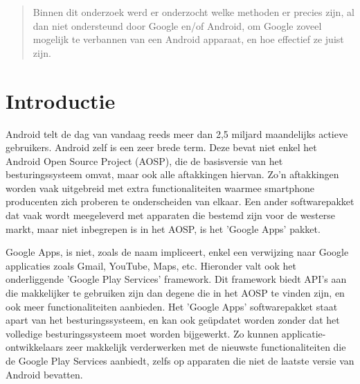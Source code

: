 \documentclass[a0,portrait]{a0poster}
\begin{document}
\begin{multicols}{2} %


\color{HoGentAccent1} %

\begin{abstract}
Binnen dit onderzoek werd er onderzocht welke methoden er precies zijn, al dan niet ondersteund door Google en/of Android, om Google zoveel mogelijk te verbannen van een Android apparaat, en hoe effectief ze juist zijn.
\end{abstract}

\setlength{\parskip}{\baselineskip}%
\setlength{\parindent}{12pt}%

\color{HoGentAccent1} 
\section*{Introductie}
\color{black}
\color{black}
Android telt de dag van vandaag reeds meer dan 2,5 miljard maandelijks actieve gebruikers. Android zelf is een zeer brede term. Deze bevat niet enkel het Android Open Source Project (AOSP), die de basisversie van het besturingssysteem omvat, maar ook alle aftakkingen hiervan. Zo'n aftakkingen worden vaak uitgebreid met extra functionaliteiten waarmee smartphone producenten zich proberen te onderscheiden van elkaar. Een ander softwarepakket dat vaak wordt meegeleverd met apparaten die bestemd zijn voor de westerse markt, maar niet inbegrepen is in het AOSP, is het 'Google Apps' pakket.

Google Apps, is niet, zoals de naam impliceert, enkel een verwijzing naar Google applicaties zoals Gmail, YouTube, Maps, etc. Hieronder valt ook het onderliggende 'Google Play Services' framework. Dit framework biedt API's aan die makkelijker te gebruiken zijn dan degene die in het AOSP te vinden zijn, en ook meer functionaliteiten aanbieden. Het 'Google Apps' softwarepakket staat apart van het besturingssysteem, en kan ook geüpdatet worden zonder dat het volledige besturingssysteem moet worden bijgewerkt. Zo kunnen applicatie-ontwikkelaars zeer makkelijk verderwerken met de nieuwste functionaliteiten die de Google Play Services aanbiedt, zelfs op apparaten die niet de laatste versie van Android bevatten.


\end{multicols}
\end{document}
